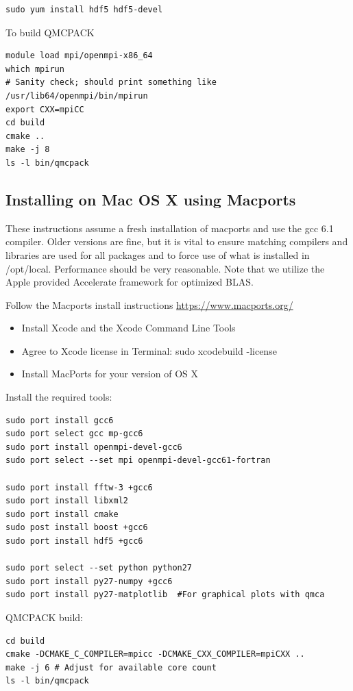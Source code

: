 \begin{verbatim}
sudo yum install hdf5 hdf5-devel
\end{verbatim}

To build QMCPACK
\begin{verbatim}
module load mpi/openmpi-x86_64
which mpirun
# Sanity check; should print something like   /usr/lib64/openmpi/bin/mpirun
export CXX=mpiCC
cd build
cmake ..
make -j 8
ls -l bin/qmcpack
\end{verbatim}

\subsection{Installing on Mac OS X using Macports}
These instructions assume a fresh installation of macports
and use the gcc 6.1 compiler. Older versions are fine, but it is vital to ensure
matching compilers and libraries are used for all
packages and to force use of what is installed in /opt/local.  Performance should be very reasonable.
Note that we utilize the Apple provided Accelerate framework for
optimized BLAS.

Follow the Macports install instructions \url{https://www.macports.org/}

\begin{itemize}
\item Install Xcode and the Xcode Command Line Tools
\item Agree to Xcode license in Terminal: sudo xcodebuild -license
\item Install MacPorts for your version of OS X
\end{itemize}


Install the required tools:

\begin{verbatim}
sudo port install gcc6
sudo port select gcc mp-gcc6
sudo port install openmpi-devel-gcc6
sudo port select --set mpi openmpi-devel-gcc61-fortran

sudo port install fftw-3 +gcc6
sudo port install libxml2
sudo port install cmake
sudo post install boost +gcc6
sudo port install hdf5 +gcc6

sudo port select --set python python27
sudo port install py27-numpy +gcc6
sudo port install py27-matplotlib  #For graphical plots with qmca
\end{verbatim}

QMCPACK build:
\begin{verbatim}
cd build
cmake -DCMAKE_C_COMPILER=mpicc -DCMAKE_CXX_COMPILER=mpiCXX ..
make -j 6 # Adjust for available core count
ls -l bin/qmcpack
\end{verbatim}

